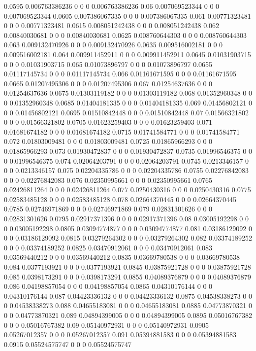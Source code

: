 {0.0595 0.006763386236 0 0 0 0.006763386236
0.06 0.007069523344 0 0 0 0.007069523344
0.0605 0.007386067335 0 0 0 0.007386067335
0.061 0.00771323481 0 0 0 0.00771323481
0.0615 0.008051242438 0 0 0 0.008051242438
0.062 0.00840030681 0 0 0 0.00840030681
0.0625 0.008760644303 0 0 0 0.008760644303
0.063 0.009132470926 0 0 0 0.009132470926
0.0635 0.009516002181 0 0 0 0.009516002181
0.064 0.009911452911 0 0 0 0.009911452911
0.0645 0.01031903715 0 0 0 0.01031903715
0.065 0.01073896797 0 0 0 0.01073896797
0.0655 0.01117145734 0 0 0 0.01117145734
0.066 0.01161671595 0 0 0 0.01161671595
0.0665 0.01207495306 0 0 0 0.01207495306
0.067 0.01254637636 0 0 0 0.01254637636
0.0675 0.01303119182 0 0 0 0.01303119182
0.068 0.01352960348 0 0 0 0.01352960348
0.0685 0.01404181335 0 0 0 0.01404181335
0.069 0.01456802121 0 0 0 0.01456802121
0.0695 0.01510842448 0 0 0 0.01510842448
0.07 0.01566321802 0 0 0 0.01566321802
0.0705 0.01623259403 0 0 0 0.01623259403
0.071 0.01681674182 0 0 0 0.01681674182
0.0715 0.01741584771 0 0 0 0.01741584771
0.072 0.01803009481 0 0 0 0.01803009481
0.0725 0.01865966293 0 0 0 0.01865966293
0.073 0.01930472837 0 0 0 0.01930472837
0.0735 0.01996546375 0 0 0 0.01996546375
0.074 0.02064203791 0 0 0 0.02064203791
0.0745 0.0213346157 0 0 0 0.0213346157
0.075 0.02204335786 0 0 0 0.02204335786
0.0755 0.02276842083 0 0 0 0.02276842083
0.076 0.02350995661 0 0 0 0.02350995661
0.0765 0.02426811264 0 0 0 0.02426811264
0.077 0.0250430316 0 0 0 0.0250430316
0.0775 0.02583485128 0 0 0 0.02583485128
0.078 0.02664370445 0 0 0 0.02664370445
0.0785 0.02746971869 0 0 0 0.02746971869
0.079 0.02831301626 0 0 0 0.02831301626
0.0795 0.02917371396 0 0 0 0.02917371396
0.08 0.03005192298 0 0 0 0.03005192298
0.0805 0.03094774877 0 0 0 0.03094774877
0.081 0.03186129092 0 0 0 0.03186129092
0.0815 0.03279264302 0 0 0 0.03279264302
0.082 0.03374189252 0 0 0 0.03374189252
0.0825 0.03470912061 0 0 0 0.03470912061
0.083 0.03569440212 0 0 0 0.03569440212
0.0835 0.03669780538 0 0 0 0.03669780538
0.084 0.0377193921 0 0 0 0.0377193921
0.0845 0.03875921728 0 0 0 0.03875921728
0.085 0.0398173291 0 0 0 0.0398173291
0.0855 0.04089376879 0 0 0 0.04089376879
0.086 0.04198857054 0 0 0 0.04198857054
0.0865 0.04310176144 0 0 0 0.04310176144
0.087 0.04423336132 0 0 0 0.04423336132
0.0875 0.04538338273 0 0 0 0.04538338273
0.088 0.04655183081 0 0 0 0.04655183081
0.0885 0.04773870321 0 0 0 0.04773870321
0.089 0.04894399005 0 0 0 0.04894399005
0.0895 0.05016767382 0 0 0 0.05016767382
0.09 0.05140972931 0 0 0 0.05140972931
0.0905 0.05267012357 0 0 0 0.05267012357
0.091 0.05394881583 0 0 0 0.05394881583
0.0915 0.05524575747 0 0 0 0.05524575747
}
